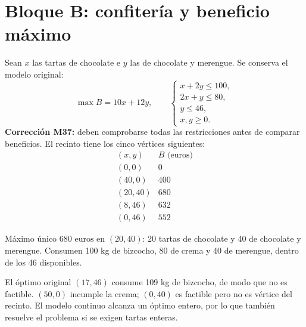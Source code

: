 \documentclass[11pt]{article}
\begin{document}
\section*{Bloque B: confitería y beneficio máximo}
Sean $x$ las tartas de chocolate e $y$ las de chocolate y merengue. Se conserva el modelo original:
\[
\max B=10x+12y,\qquad
\begin{cases}
x+2y\leq100,\\
2x+y\leq80,\\
y\leq46,\\
x,y\geq0.
\end{cases}
\]
\textbf{Corrección M37:} deben comprobarse todas las restricciones antes de comparar beneficios. El recinto tiene los cinco vértices siguientes:
\[
\begin{array}{c|r}
(x,y)&B\text{ (euros)}\\\hline
(0,0)&0\\(40,0)&400\\(20,40)&680\\(8,46)&632\\(0,46)&552
\end{array}
\]
\begin{center}\end{center}
Máximo único $\boxed{680\text{ euros en }(20,40)}$: 20 tartas de chocolate y 40 de chocolate y merengue. Consumen 100 kg de bizcocho, 80 de crema y 40 de merengue, dentro de los 46 disponibles.

El óptimo original $(17,46)$ consume 109 kg de bizcocho, de modo que no es factible. $(50,0)$ incumple la crema; $(0,40)$ es factible pero no es vértice del recinto. El modelo continuo alcanza un óptimo entero, por lo que también resuelve el problema si se exigen tartas enteras.
\clearpage
\end{document}
